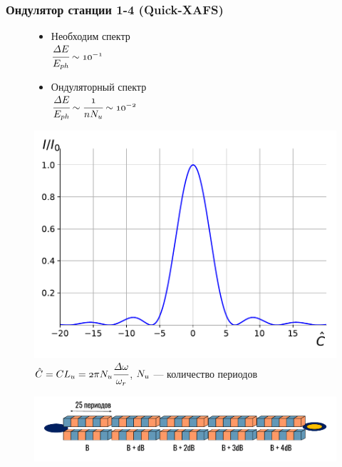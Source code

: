 \documentclass[14pt, hyperref = {colorlinks},xcolor=table ]{beamer}
\begin{document}
\small
\begin{frame}
\frametitle{Ондулятор станции 1-4 (Quick-XAFS)}\label{t1}
\begin{figure}[h]
	\begin{minipage}[h]{0.49\linewidth}
	\vspace{-25pt}
	\begin{itemize}
		\item {Необходим спектр\\
		\vspace{5pt}	
		$\mathnormal{\cfrac{\Delta E}{E_{ph}} \sim 10^{-1}}$}
		\item {Ондуляторный спектр\\
		\vspace{5pt}
		$\mathnormal{\cfrac{\Delta E}{E_{ph}} \sim \cfrac{1}{nN_u} \sim 10^{-2}}$}
	\end{itemize}
	\end{minipage}
	\begin{minipage}[h]{0.49\linewidth}
		\includegraphics[width=0.99\linewidth]{pic/spec_C.pdf}\\
		\tiny{$\mathnormal{\hat{C} = CL_u = 2\pi N_u\cfrac{\Delta\omega}{\omega_r}}$, $\mathnormal{N_u}$ --- количество периодов}
	\end{minipage}	
\end{figure}
\vspace{-20pt}
\begin{figure}[h]
	\raggedright{\includegraphics[width=0.99\linewidth]{pic/und.pdf}}
\end{figure}
\end{frame}
\end{document}
